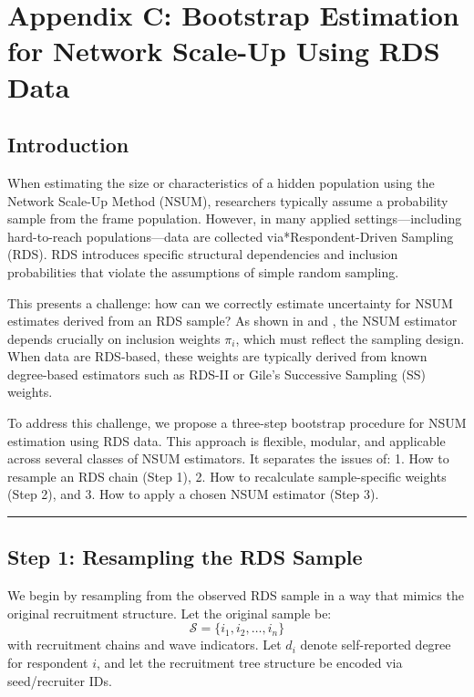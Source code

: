 \documentclass[
  12pt,
  letterpaper,
  DIV=11,
  numbers=noendperiod]{scrartcl}
\theoremstyle{plain}
\theoremstyle{definition}
\begin{document}
\section{Appendix C: Bootstrap Estimation for Network Scale-Up Using RDS
Data}\label{sec:3step}

\subsection{Introduction}\label{introduction}

When estimating the size or characteristics of a hidden population using
the Network Scale-Up Method (NSUM), researchers typically assume a
probability sample from the frame population. However, in many applied
settings---including hard-to-reach populations---data are collected
via*Respondent-Driven Sampling (RDS). RDS introduces specific structural
dependencies and inclusion probabilities that violate the assumptions of
simple random sampling.

This presents a challenge: how can we correctly estimate uncertainty for
NSUM estimates derived from an RDS sample? As shown in
\textcite{feeh16-generalizing} and \textcite{salg06-variance}, the NSUM
estimator depends crucially on inclusion weights \(\pi_i\), which must
reflect the sampling design. When data are RDS-based, these weights are
typically derived from known degree-based estimators such as RDS-II or
Gile's Successive Sampling (SS) weights.

To address this challenge, we propose a three-step bootstrap procedure
for NSUM estimation using RDS data. This approach is flexible, modular,
and applicable across several classes of NSUM estimators. It separates
the issues of: 1. How to resample an RDS chain (Step 1), 2. How to
recalculate sample-specific weights (Step 2), and 3. How to apply a
chosen NSUM estimator (Step 3).

\begin{center}\rule{0.5\linewidth}{0.5pt}\end{center}

\subsection{Step 1: Resampling the RDS
Sample}\label{step-1-resampling-the-rds-sample}

We begin by resampling from the observed RDS sample in a way that mimics
the original recruitment structure. Let the original sample be: \[
\mathcal{S} = \{i_1, i_2, \dots, i_n\}
\] with recruitment chains and wave indicators. Let \(d_i\) denote
self-reported degree for respondent \(i\), and let the recruitment tree
structure be encoded via seed/recruiter IDs.
\end{document}
